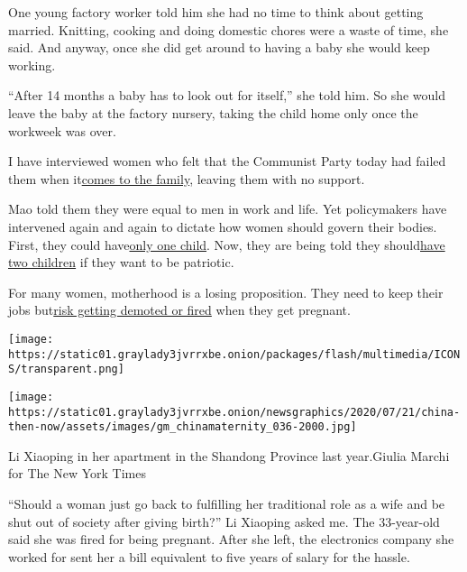 One young factory worker told him she had no time to think about getting
married. Knitting, cooking and doing domestic chores were a waste of
time, she said. And anyway, once she did get around to having a baby she
would keep working.

``After 14 months a baby has to look out for itself,'' she told him. So
she would leave the baby at the factory nursery, taking the child home
only once the workweek was over.

I have interviewed women who felt that the Communist Party today had
failed them when
it\href{https://www.nytimes3xbfgragh.onion/2019/07/16/world/asia/china-women-discrimination.html}{}\href{https://www.nytimes3xbfgragh.onion/2019/07/16/world/asia/china-women-discrimination.html}{comes
to the family}, leaving them with no support.

Mao told them they were equal to men in work and life. Yet policymakers
have intervened again and again to dictate how women should govern their
bodies. First, they could
have\href{https://www.nytimes3xbfgragh.onion/2015/11/06/magazine/the-long-shadow-of-chinas-one-child-policy.html}{}\href{https://www.nytimes3xbfgragh.onion/2015/11/06/magazine/the-long-shadow-of-chinas-one-child-policy.html}{only
one child}. Now, they are being told they
should\href{https://www.nytimes3xbfgragh.onion/2018/08/11/world/asia/china-one-child-policy-birthrate.html}{}\href{https://www.nytimes3xbfgragh.onion/2018/08/11/world/asia/china-one-child-policy-birthrate.html}{have
two children} if they want to be patriotic.

For many women, motherhood is a losing proposition. They need to keep
their jobs
but\href{https://www.nytimes3xbfgragh.onion/2019/11/01/business/china-mothers-discrimination-working-.html}{}\href{https://www.nytimes3xbfgragh.onion/2019/11/01/business/china-mothers-discrimination-working-.html}{risk
getting demoted or fired} when they get pregnant.

\texttt{[image: https://static01.graylady3jvrrxbe.onion/packages/flash/multimedia/ICONS/transparent.png]}

\texttt{[image: https://static01.graylady3jvrrxbe.onion/newsgraphics/2020/07/21/china-then-now/assets/images/gm\_chinamaternity\_036-2000.jpg]}

Li Xiaoping in her apartment in the Shandong Province last year.Giulia
Marchi for The New York Times

``Should a woman just go back to fulfilling her traditional role as a
wife and be shut out of society after giving birth?'' Li Xiaoping asked
me. The 33-year-old said she was fired for being pregnant. After she
left, the electronics company she worked for sent her a bill equivalent
to five years of salary for the hassle.

